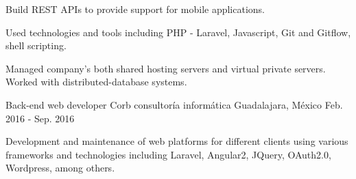 \begin{cventries}
{\begin{cvitems}
                \item {Build REST APIs to provide support for mobile applications.}
                \item {Used technologies and tools including PHP - Laravel, Javascript, Git and Gitflow, shell scripting.}
                \item {Managed company's both shared hosting servers and virtual private servers. Worked with distributed-database systems.}
            \end{cvitems}
        }
    \cventry
        {Back-end web developer}
        {Corb consultoría informática}
        {Guadalajara, México}
        {Feb. 2016 - Sep. 2016}
        {
            \begin{cvitems}
                \item {Development and maintenance of web platforms for different clients using various frameworks and technologies including Laravel, Angular2, JQuery, OAuth2.0, Wordpress, among others.}
            \end{cvitems}
        }
\end{cventries}
